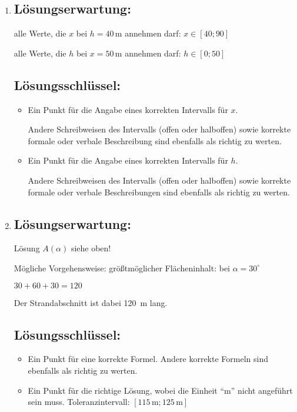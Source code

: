 \begin{langesbeispiel}
{\begin{enumerate}
	\item \subsection{Lösungserwartung:}

alle Werte, die $x$ bei $h=40$\,m annehmen darf: $x\in[40;90]$

alle Werte, die $h$ bei $x=50$\,m annehmen darf: $h\in[0;50]$

\subsection{Lösungsschlüssel:}
\begin{itemize}
	\item Ein Punkt für die Angabe eines korrekten Intervalls für $x$.
	
	Andere Schreibweisen des Intervalls (offen oder halboffen) sowie korrekte formale oder verbale Beschreibung sind ebenfalls als richtig zu werten.
	
	\item Ein Punkt für die Angabe eines korrekten Intervalls für $h$.
	
	Andere Schreibweisen des Intervalls (offen oder halboffen) sowie korrekte formale oder verbale Beschreibungen sind ebenfalls als richtig zu werten.
\end{itemize}

\item \subsection{Lösungserwartung:}

Lösung $A(\alpha)$ siehe oben!\leer

Mögliche Vorgehensweise:
größtmöglicher Flächeninhalt: bei $\alpha=30^\circ$

$30+60+30=120$

Der Strandabschnitt ist dabei 120\, m lang.

\subsection{Lösungsschlüssel:}
\begin{itemize}
	\item Ein Punkt für eine korrekte Formel. Andere korrekte Formeln sind ebenfalls als richtig zu werten.
	\item Ein Punkt für die richtige Lösung, wobei die Einheit "`m"' nicht angeführt sein muss. Toleranzintervall: $[115\,\text{m};125\,\text{m}]$
\end{itemize}
\end{enumerate}}
		\end{langesbeispiel}